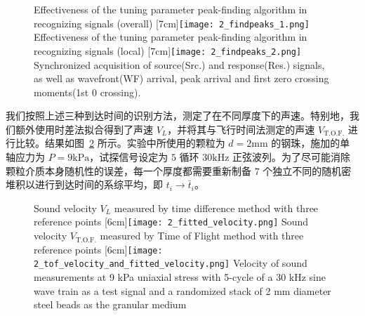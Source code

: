 \begin{figure}[!hbtp]
  \centering
                  {Effectiveness of the tuning parameter peak-finding algorithm in recognizing signals (overall)}%
                  [7cm]{\texttt{[image: 2\_findpeaks\_1.png]}}
  \hspace{1cm}
                  {Effectiveness of the tuning parameter peak-finding algorithm in recognizing signals (local)}%
                  [7cm]{\texttt{[image: 2\_findpeaks\_2.png]}}
            {Synchronized acquisition of source(Src.) and response(Res.) signals, as well as wavefront(WF) arrival, peak arrival and first zero crossing moments(1st 0 crossing).}
  \label{fig:reference_point}
\end{figure}

我们按照上述三种到达时间的识别方法，测定了在不同厚度下的声速。特别地，我们额外使用时差法拟合得到了声速 $V_{L}$，并将其与飞行时间法测定的声速 $V_{\text{T.O.F.}}$ 进行比较。结果如图~\ref{fig:sound_velocity_measurement} 所示。实验中所使用的颗粒为 $d=2\unit{\milli\meter}$ 的钢珠，施加的单轴应力为 $P=9\unit{\kilo\Pa}$，试探信号设定为 $5$ 循环 $30\unit{\kilo\Hz}$ 正弦波列。为了尽可能消除颗粒介质本身随机性的误差，每一个厚度都需要重新制备 $7$ 个独立不同的随机密堆积以进行到达时间的系综平均，即 $t_{i}\rightarrow \bar{t}_{i}$。

\begin{figure}[!hbtp]
  \centering
                  {Sound velocity $V_{L}$ measured by time difference method with three reference points}%
                  [6cm]{\texttt{[image: 2\_fitted\_velocity.png]}}
  \hspace{1cm}
                  {Sound velocity $V_{\text{T.O.F.}}$ measured by Time of Flight method with three reference points}%
                  [6cm]{\texttt{[image: 2\_tof\_velocity\_and\_fitted\_velocity.png]}}
            {Velocity of sound measurements at 9 \unit{\kilo\Pa} uniaxial stress with 5-cycle of a 30 \unit{\kilo\Hz} sine wave train as a test signal and a randomized stack of 2 \unit{\milli\meter} diameter steel beads as the granular medium}
  \label{fig:sound_velocity_measurement}
\end{figure}

